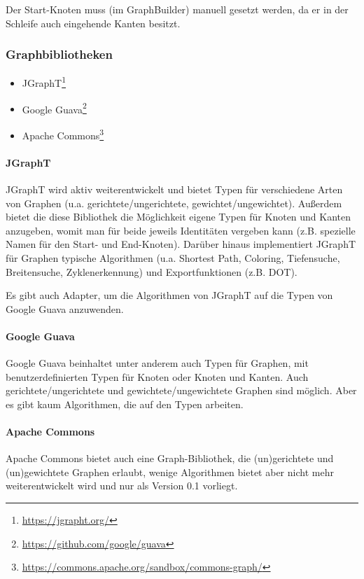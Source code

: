 \documentclass[../InterneDSLs.tex]{subfiles}
\begin{document}
Der Start-Knoten muss (im GraphBuilder) manuell gesetzt werden, da er in der Schleife auch eingehende Kanten besitzt.

\subsubsection{Graphbibliotheken}
\begin{itemize}
	\item JGraphT\footnote{\url{https://jgrapht.org/}}
	\item Google Guava\footnote{\url{https://github.com/google/guava}}
	\item Apache Commons\footnote{\url{https://commons.apache.org/sandbox/commons-graph/}}
\end{itemize}

\paragraph{JGraphT}
JGraphT wird aktiv weiterentwickelt und bietet Typen für verschiedene Arten von Graphen (u.a. gerichtete/ungerichtete, gewichtet/ungewichtet). Außerdem bietet die diese Bibliothek die Möglichkeit eigene Typen für Knoten und Kanten anzugeben, womit man für beide jeweils Identitäten vergeben kann (z.B. spezielle Namen für den Start- und End-Knoten). Darüber hinaus implementiert JGraphT für Graphen typische Algorithmen (u.a. Shortest Path, Coloring, Tiefensuche, Breitensuche, Zyklenerkennung) und Exportfunktionen (z.B. DOT).

Es gibt auch Adapter, um die Algorithmen von JGraphT auf die Typen von Google Guava anzuwenden.

\paragraph{Google Guava}
Google Guava beinhaltet unter anderem auch Typen für Graphen, mit benutzerdefinierten Typen für Knoten oder Knoten und Kanten. Auch gerichtete/ungerichtete und gewichtete/ungewichtete Graphen sind möglich. Aber es gibt kaum Algorithmen, die auf den Typen arbeiten.

\paragraph{Apache Commons}
Apache Commons bietet auch eine Graph-Bibliothek, die (un)gerichtete und (un)gewichtete Graphen erlaubt, wenige Algorithmen bietet aber nicht mehr weiterentwickelt wird und nur als Version 0.1 vorliegt.
\end{document}
